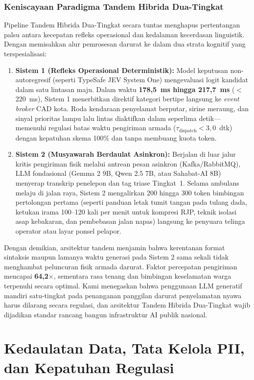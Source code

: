 \documentclass[journal,compsoc]{IEEEtran}
\begin{document}
\subsubsection{Keniscayaan Paradigma Tandem Hibrida Dua-Tingkat}
Pipeline Tandem Hibrida Dua-Tingkat secara tuntas menghapus pertentangan palsu antara kecepatan refleks operasional dan kedalaman kecerdasan linguistik. Dengan memisahkan alur pemrosesan darurat ke dalam dua strata kognitif yang terspesialisasi:
\begin{enumerate}
    \item \textbf{Sistem 1 (Refleks Operasional Deterministik):} Model keputusan non-autoregresif (seperti TypeSafe JEV System One) mengevaluasi logit kandidat dalam satu lintasan maju. Dalam waktu \textbf{178,5~ms hingga 217,7~ms} ($<$220~ms), Sistem 1 menerbitkan direktif kategori bertipe langsung ke \textit{event broker} CAD kota. Roda kendaraan penyelamat berputar, sirine meraung, dan sinyal prioritas lampu lalu lintas diaktifkan dalam seperlima detik—memenuhi regulasi batas waktu pengiriman armada ($\tau_{\text{dispatch}} < 3{,}0$~dtk) dengan kepatuhan skema 100\% dan tanpa membuang kuota token.
    \item \textbf{Sistem 2 (Musyawarah Berdaulat Asinkron):} Berjalan di luar jalur kritis pengiriman fisik melalui antrean pesan asinkron (Kafka/RabbitMQ), LLM fondasional (Gemma 2 9B, Qwen 2.5 7B, atau Sahabat-AI 8B) menyerap transkrip penelepon dan tag triase Tingkat~1. Selama ambulans melaju di jalan raya, Sistem 2 mengalirkan 200 hingga 300 token bimbingan pertolongan pertama (seperti panduan letak tumit tangan pada tulang dada, ketukan irama 100--120 kali per menit untuk kompresi RJP, teknik isolasi asap kebakaran, dan pembebasan jalan napas) langsung ke penyuara telinga operator atau layar ponsel pelapor.
\end{enumerate}

Dengan demikian, arsitektur tandem menjamin bahwa kerentanan format sintaksis maupun lamanya waktu generasi pada Sistem 2 sama sekali tidak menghambat peluncuran fisik armada darurat. Faktor percepatan pengiriman mencapai \textbf{64,2$\times$}, sementara rasa tenang dan bimbingan keselamatan warga terpenuhi secara optimal. Kami menegaskan bahwa penggunaan LLM generatif mandiri satu-tingkat pada penanganan panggilan darurat penyelamatan nyawa harus dilarang secara regulasi, dan arsitektur Tandem Hibrida Dua-Tingkat wajib dijadikan standar rancang bangun infrastruktur AI publik nasional.

\section{Kedaulatan Data, Tata Kelola PII, dan Kepatuhan Regulasi}
\end{document}
